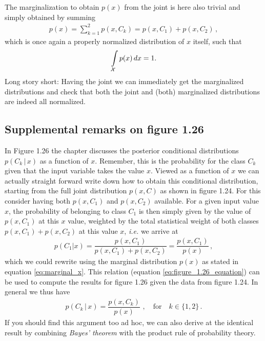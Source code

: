 \documentclass[11pt, DINA4, fleqn]{amsart}
\begin{document}
The marginalization to obtain $p(x)$ from the joint is here also trivial and simply obtained by summing
\begin{align}
p(x) = \sum_{k=1}^{2} p(x, C_k) = p(x, C_1) + p(x, C_2) \, ,
\label{eq:marginal_x}
\end{align}
which is once again a properly normalized distribution of $x$ itself, such that
\begin{align}
\int\displaylimits_{\mathcal{X}} p(x) \, dx = 1.
\end{align}
Long story short: Having the joint we can immediately get the marginalized distributions and check that both the joint and (both) marginalized distributions are indeed all normalized.

\subsection{Supplemental remarks on figure 1.26}
In Figure 1.26 the chapter discusses the posterior conditional distributions $p(C_k \, | \, x)$ as a function of $x$.
Remember, this is the probability for the class $C_k$ given that the input variable takes the value $x$. Viewed as a function of $x$ we can actually straight forward write down how to obtain this conditional distribution, starting from the full joint distribution $p(x, C)$ as shown in figure 1.24.
For this consider having both $p(x, C_1)$ and $p(x, C_2)$ available. For a given input value $x$, the probability of belonging to class $C_1$ is then simply given by the value of $p(x, C_1)$ at this $x$ value, weighted by the total statistical weight of both classes $p(x, C_1) + p(x,C_2)$ at this value $x$,
\textit{i.e.} we arrive at 
\begin{align}
p(C_1 | x) = \dfrac{p(x, C_1)}{p(x, C_1) + p(x, C_2)} = \dfrac{p(x, C_1)}{p(x)} \, ,
\label{eq:figure_1.26_equation}
\end{align}
which we could rewrite using the marginal distribution $p(x)$ as stated in equation \eqref{eq:marginal_x}.
This relation (equation \eqref{eq:figure_1.26_equation}) can be used to compute the results for figure 1.26 given the data from figure 1.24.
In general we thus have
\begin{align}
p(C_k \, |\, x) = \dfrac{p(x, C_k)}{p(x)} \, \, , \quad \text{for} \quad k\in\{1,2\}\, .
\label{eq:figure_1.26_equation_mk2}
\end{align}
If you should find this argument too ad hoc, we can also derive at the identical result by combining \emph{Bayes' theorem} with the product rule of probability theory.
\end{document}
